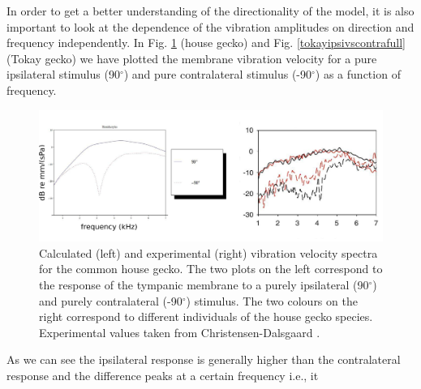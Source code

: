 
In order to get a better understanding of the directionality of the model, it is also important to look at the dependence of the vibration amplitudes on direction and frequency independently. 
In Fig. \ref{hemidactylusipsivscontrafull} (house gecko)
and Fig. \ref{tokayipsivscontrafull} (Tokay gecko) we have plotted the membrane vibration velocity for a pure ipsilateral stimulus (90$^\circ$) and pure contralateral stimulus (-90$^\circ$)
as a function of frequency.
\begin{figure}[ht!]
 \centering
 \includegraphics[width=1.0\linewidth]{Diagrams/Plots/hemidactylusipsivscontrafull.png}
 \caption[Frequency dependence of ipsi- and contralateral membrane vibration amplitudes - common house gecko]{Calculated (left) and experimental (right) vibration velocity spectra for the common house gecko. The two plots
 on the left correspond to the response of the tympanic membrane to a purely ipsilateral (90$^\circ$) and purely contralateral (-90$^\circ$) stimulus.  The two colours on the right correspond to
 different individuals of the house gecko species. Experimental values taken from Christensen-Dalsgaard \cite{dalsgaardmanley2}.}
  \label{hemidactylusipsivscontrafull}
\end{figure}
As we can see the ipsilateral response is generally higher than the contralateral response and the difference peaks at a certain frequency i.e., it
